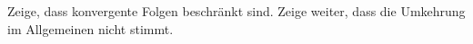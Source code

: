 \begin{exercise}
  Zeige, dass konvergente Folgen beschränkt sind. Zeige weiter, dass die
  Umkehrung im Allgemeinen nicht stimmt.
\end{exercise}
